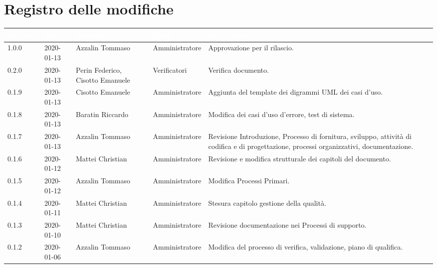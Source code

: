 \section*{Registro delle modifiche}
{
\renewcommand{\arraystretch}{1.5}
\centering
\begin{longtable}{C{2cm} C{2cm}  C{3cm}  C{3cm} C{4.5cm}}
\textcolor{white}{\textbf{Versione}} & \textcolor{white}{\textbf{Data}} & \textcolor{white}{\textbf{Nominativo}} & \textcolor{white}{\textbf{Ruolo}} & \textcolor{white}{\textbf{Descrizione}}\\	
\endhead

1.0.0 & 2020-01-13 & Azzalin Tommaso & Amministratore & Approvazione per il rilascio.  \\

0.2.0 & 2020-01-13 & Perin Federico, Cisotto Emanuele & Verificatori & Verifica documento.  \\ 

0.1.9 & 2020-01-13 & Cisotto Emanuele & Amministratore & Aggiunta del template dei digrammi UML dei casi d'uso. \\

0.1.8 & 2020-01-13 & Baratin Riccardo & Amministratore & Modifica dei casi d'uso d'errore, test di sistema. \\

0.1.7 & 2020-01-13 & Azzalin Tommaso & Amministratore & Revisione Introduzione, Processo di fornitura, sviluppo, attività di codifica e di progettazione, processi organizzativi, documentazione. \\

0.1.6 & 2020-01-12 & Mattei Christian & Amministratore & Revisione e modifica strutturale dei capitoli del documento. \\

0.1.5 & 2020-01-12 & Azzalin Tommaso & Amministratore & Modifica Processi Primari. \\

0.1.4 & 2020-01-11 & Mattei Christian & Amministratore & Stesura capitolo gestione della qualità. \\

0.1.3 & 2020-01-10 & Mattei Christian & Amministratore & Revisione documentazione nei Processi di supporto. \\

0.1.2 & 2020-01-06 & Azzalin Tommaso & Amministratore & Modifica del processo di verifica, validazione, piano di qualifica. \\


\end{longtable}}
